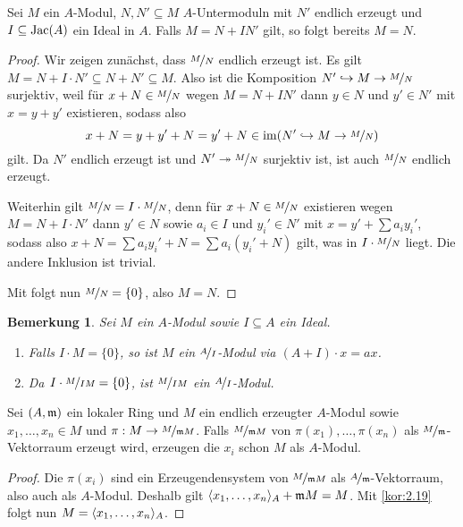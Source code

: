 \documentclass[12pt,a4paper]{scrartcl}
\theoremstyle{cplain}
\theoremstyle{cdef}
\newtheorem{beme}[thmcounter]{Bemerkung}
\begin{document}
\begin{kor} \label{kor:2.19}
	Sei $M$ ein $A$-Modul, $N,N' \subseteq M$ $A$-Untermoduln mit $N'$ endlich erzeugt und $I\subseteq \operatorname{Jac}(A)$ ein Ideal in $A$. Falls $M=N + IN'$ gilt, so folgt bereits $M=N$.
\end{kor}
\begin{proof}
	Wir zeigen zunächst, dass $\nicefrac{M}{N}$ endlich erzeugt ist. Es gilt $M=N+ I \cdot N' \subseteq N+ N' \subseteq M$. Also ist die Komposition $N' \hookrightarrow M \to \nicefrac{M}{N}$ surjektiv, weil für $x+ N \in \nicefrac{M}{N}$ wegen $M=N+IN'$ dann $y\in N$ und $y' \in N'$ mit $x=y+y'$ existieren, sodass also \[x+N=y+y'+N = y' + N \in \operatorname{im}(N' \hookrightarrow M \to \nicefrac{M}{N}) \] gilt. Da $N'$ endlich erzeugt ist und $N' \twoheadrightarrow \nicefrac{M}{N}$ surjektiv ist, ist auch $\nicefrac{M}{N}$ endlich erzeugt.
	
	Weiterhin gilt $\nicefrac{M}{N} = I \cdot \nicefrac{M}{N}$, denn für $x+N \in \nicefrac{M}{N}$ existieren wegen $M=N+ I\cdot N'$ dann $y' \in N$ sowie $a_i \in I$ und $y_i' \in N'$ mit $x= y' + \sum a_iy_i'$, sodass also $x+ N = \sum a_iy_i' + N = \sum a_i(y_i' + N) $ gilt, was in $I \cdot \nicefrac{M}{N}$ liegt. Die andere Inklusion ist trivial.
	
	Mit  folgt nun $\nicefrac{M}{N} = \{0\}$, also $M=N$.
\end{proof}
\begin{beme}
	Sei $M$ ein $A$-Modul sowie $I \subseteq A$ ein Ideal.
	\begin{enumerate}
		\item Falls $I \cdot M = \{0\}$, so ist $M$ ein $\nicefrac{A}{I}$-Modul via $(A+I) \cdot x = ax$.
		\item Da $I \cdot \nicefrac{M}{I M} = \{0\}$, ist $\nicefrac{M}{IM}$ ein $\nicefrac{A}{I}$-Modul.
	\end{enumerate}
\end{beme}
\begin{kor}
	Sei $(A,\mathfrak{m})$ ein lokaler Ring und $M$ ein endlich erzeugter $A$-Modul sowie $x_1,\ldots,x_n \in M$ und $\pi: M \to \nicefrac{M}{\mathfrak{m} M}$. Falls $\nicefrac{M}{\mathfrak{m} M}$ von $\pi(x_1),\ldots,\pi(x_n)$ als $\nicefrac{M}{\mathfrak{m}}$-Vektorraum erzeugt wird, erzeugen die $x_i$ schon $M$ als $A$-Modul.
\end{kor}
\begin{proof}
	Die $\pi(x_i)$ sind ein Erzeugendensystem von $\nicefrac{M}{\mathfrak{m} M}$ als $\nicefrac{A}{\mathfrak{m}}$-Vektorraum, also auch als $A$-Modul. Deshalb gilt $\langle x_1,\ldots,x_n\rangle_A + \mathfrak{m} M = M$. Mit \cref{kor:2.19} folgt nun $M= \langle x_1,\ldots,x_n\rangle_A$.
\end{proof}
\end{document}
